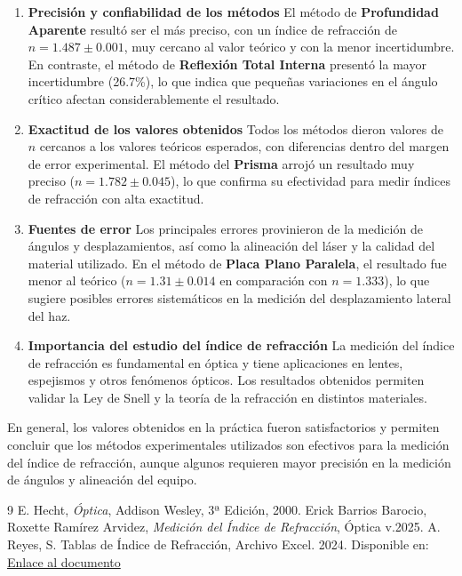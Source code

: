 \documentclass[article,12pt]{elsarticle}
\begin{document}
\begin{enumerate}
    \item \textbf{Precisión y confiabilidad de los métodos}  
    El método de \textbf{Profundidad Aparente} resultó ser el más preciso, con un índice de refracción de $n = 1.487 \pm 0.001$, muy cercano al valor teórico y con la menor incertidumbre. En contraste, el método de \textbf{Reflexión Total Interna} presentó la mayor incertidumbre (26.7\%), lo que indica que pequeñas variaciones en el ángulo crítico afectan considerablemente el resultado.
    
    \item \textbf{Exactitud de los valores obtenidos}  
    Todos los métodos dieron valores de $n$ cercanos a los valores teóricos esperados, con diferencias dentro del margen de error experimental. El método del \textbf{Prisma} arrojó un resultado muy preciso ($n = 1.782 \pm 0.045$), lo que confirma su efectividad para medir índices de refracción con alta exactitud.
    
    \item \textbf{Fuentes de error}  
    Los principales errores provinieron de la medición de ángulos y desplazamientos, así como la alineación del láser y la calidad del material utilizado. En el método de \textbf{Placa Plano Paralela}, el resultado fue menor al teórico ($n = 1.31 \pm 0.014$ en comparación con $n = 1.333$), lo que sugiere posibles errores sistemáticos en la medición del desplazamiento lateral del haz.
    
    \item \textbf{Importancia del estudio del índice de refracción}  
    La medición del índice de refracción es fundamental en óptica y tiene aplicaciones en lentes, espejismos y otros fenómenos ópticos. Los resultados obtenidos permiten validar la Ley de Snell y la teoría de la refracción en distintos materiales.
\end{enumerate}

En general, los valores obtenidos en la práctica fueron satisfactorios y permiten concluir que los métodos experimentales utilizados son efectivos para la medición del índice de refracción, aunque algunos requieren mayor precisión en la medición de ángulos y alineación del equipo.

 



\begin{thebibliography}{9}
     E. Hecht, \textit{Óptica}, Addison Wesley, 3ª Edición, 2000.
     Erick Barrios Barocio, Roxette Ramírez Arvidez, \textit{Medición del Índice de Refracción}, Óptica v.2025.
        A. Reyes, S. Tablas de Índice de Refracción, Archivo Excel. 2024. Disponible en: \href{https://docs.google.com/spreadsheets/d/1aX8uVuEyiOjETpa2oIGZVDQLiuMoqKv-/edit?usp=sharing&ouid=112625838925660900694&rtpof=true&sd=true}{Enlace al documento}
\end{thebibliography}
\end{document}
